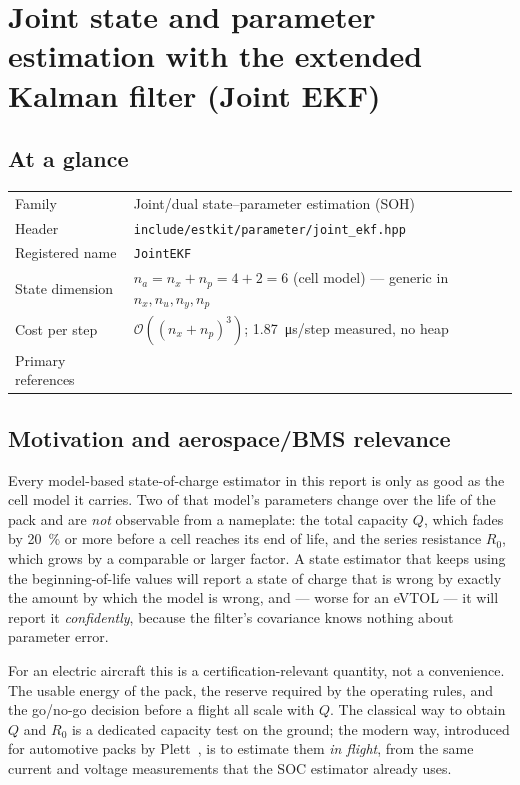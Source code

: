 \chapter{Joint state and parameter estimation with the extended Kalman filter (Joint EKF)}
\label{ch:jointekf}

\section*{At a glance}
\begin{tabular}{@{}l>{\raggedright\arraybackslash}p{}@{}}
Family & Joint/dual state--parameter estimation (SOH) \\
Header & \texttt{include/estkit/parameter/joint\_ekf.hpp} \\
Registered name & \texttt{JointEKF} \\
State dimension & $n_a = n_x + n_p = 4 + 2 = 6$ (cell model) --- generic in $n_x, n_u, n_y, n_p$ \\
Cost per step & $\mathcal{O}\!\left((n_x+n_p)^3\right)$; \SI{1.87}{\micro\second}/step measured, no heap \\
Primary references & \cite{plett2004ekf3,ljung1979ekf,wannelson2001dual,jazwinski1970} \\
\end{tabular}

\section{Motivation and aerospace/BMS relevance}
Every model-based state-of-charge estimator in this report is only as good as the cell model it
carries.  Two of that model's parameters change over the life of the pack and are \emph{not}
observable from a nameplate: the total capacity $Q$, which fades by \SI{20}{\percent} or more before
a cell reaches its end of life, and the series resistance $R_0$, which grows by a comparable or
larger factor.  A state estimator that keeps using the beginning-of-life values will report a
state of charge that is wrong by exactly the amount by which the model is wrong, and --- worse for
an eVTOL --- it will report it \emph{confidently}, because the filter's covariance knows nothing
about parameter error.

For an electric aircraft this is a certification-relevant quantity, not a convenience.  The usable
energy of the pack, the reserve required by the operating rules, and the go/no-go decision before a
flight all scale with $Q$.  The classical way to obtain $Q$ and $R_0$ is a dedicated capacity test
on the ground; the modern way, introduced for automotive packs by Plett~\cite{plett2004ekf3}, is to
estimate them \emph{in flight}, from the same current and voltage measurements that the SOC
estimator already uses.

